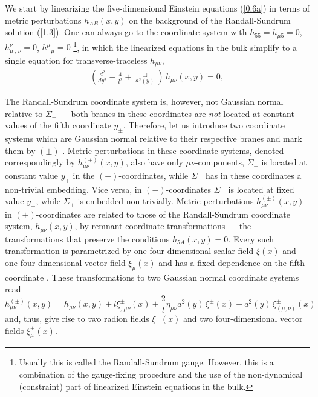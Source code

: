 \documentclass[a4paper,preprint,nofootinbib,
                 showpacs,preprintnumbers,amsmath,amssymb]{revtex4}
\begin{document}
We start by linearizing the five-dimensional Einstein equations 
(\ref{0.6a}) in terms of metric perturbations $h_{AB}(x,y)$ on the 
background of the Randall-Sundrum solution (\ref{1.3}). 
One can always go to the coordinate system with 
    $h_{55}= h_{\mu 5} = 0$, 
    $h^\nu_{\mu\,,\,\nu} =0$, 
    $h^{\mu}{}_{\mu} = 0$ 
\cite{ChGR,GKR}\footnote{Usually this is called 
the Randall-Sundrum gauge. However, this is a combination of the 
gauge-fixing procedure and the use of the non-dynamical (constraint) 
part of linearized Einstein equations in the bulk.}, 
in which the linearized equations in the bulk simplify to a 
single equation for transverse-traceless $h_{\mu\nu}$, 
    \begin{eqnarray} 
    \left(\frac{d^2}{d y^2} 
    -\frac{4}{l^2} + \frac{\Box}{a^2 (y)}\right) 
    \,h_{\mu \nu}(x,y) = 0,     \label{2.11} 
    \end{eqnarray} 
 
The Randall-Sundrum coordinate system is, however, not 
Gaussian normal relative to $\Sigma_\pm$ --- both branes in these 
coordinates are {\em not} located at constant values of the fifth 
coordinate $y_\pm$. Therefore, let us introduce two coordinate systems 
which are Gaussian normal relative to their respective branes and 
mark them by $(\pm)$ \cite{ChGR}. Metric perturbations in these 
coordinate systems, denoted correspondingly by 
$h_{\mu\nu}^{(\pm)}(x,y)$, also have only $\mu\nu$-components, 
$\Sigma_+$ is located at constant value $y_+$ in the 
$(+)$-coordinates, while $\Sigma_-$ has in these coordinates a 
non-trivial embedding. Vice versa, in $(-)$-coordinates $\Sigma_-$ 
is located at fixed value $y_-$, while $\Sigma_+$ is embedded 
non-trivially. Metric perturbations $h_{\mu\nu}^{(\pm)}(x,y)$ in 
$(\pm)$-coordinates are related to those of the Randall-Sundrum 
coordinate system, $h_{\mu\nu}(x,y)$, by remnant coordinate 
transformations --- the transformations that preserve the 
conditions $h_{5A}(x,y)=0$. Every such transformation is 
parametrized by one four-dimensional scalar field $\xi(x)$ and one 
four-dimensional vector field $\xi_\mu(x)$ and has a fixed 
dependence on the fifth coordinate \cite{GT}. These 
transformations to two Gaussian normal coordinate systems read 
    \begin{equation} 
    h^{(\pm)}_{\mu \nu}(x,y) 
    = h_{\mu \nu}(x,y)+ l \xi^\pm_{,\,\mu \nu}(x) 
    +\frac{2}{l} \eta_{\mu \nu} a^2(y)\,\xi^\pm(x) 
    +a^2(y)\,\xi^\pm_{(\mu,\nu)}(x)                \label{2.13} 
    \end{equation} 
and, thus, give rise to two radion fields $\xi^\pm(x)$ and two 
four-dimensional vector fields $\xi^\pm_\mu(x)$. 
 
\end{document}
